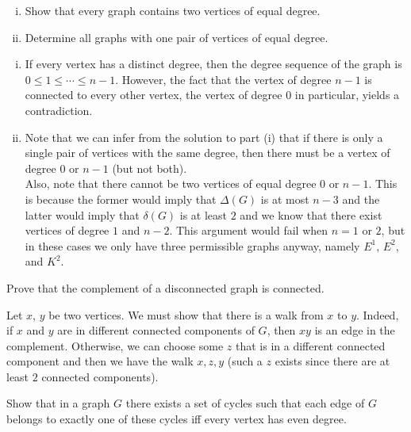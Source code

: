 \begin{exercise}\phantom{owo}
\begin{enumerate}[(i)]
    \item Show that every graph contains two vertices of equal degree.
    \item Determine all graphs with one pair of vertices of equal degree.
\end{enumerate}
\end{exercise}
\begin{solution}
\begin{enumerate}[(i)]
    \item If every vertex has a distinct degree, then the degree sequence of the graph is $0\leq 1\leq\cdots\leq n-1$. However, the fact that the vertex of degree $n-1$ is connected to every other vertex, the vertex of degree $0$ in particular, yields a contradiction.
    
    \item Note that we can infer from the solution to part (i) that if there is only a single pair of vertices with the same degree, then there must be a vertex of degree $0$ or $n-1$ (but not both).\\
    Also, note that there cannot be two vertices of equal degree $0$ or $n-1$. This is because the former would imply that $\Delta(G)$ is at most $n-3$ and the latter would imply that $\delta(G)$ is at least $2$ and we know that there exist vertices of degree $1$ and $n-2$. This argument would fail when $n=1$ or $2$, but in these cases we only have three permissible graphs anyway, namely $E^1$, $E^2$, and $K^2$. \\
\end{enumerate}
\end{solution}

\begin{exercise}
Prove that the complement of a disconnected graph is connected.
\end{exercise}
\begin{solution}
Let $x$, $y$ be two vertices. We must show that there is a walk from $x$ to $y$. Indeed, if $x$ and $y$ are in different connected components of $G$, then $xy$ is an edge in the complement. Otherwise, we can choose some $z$ that is in a different connected component and then we have the walk $x,z,y$ (such a $z$ exists since there are at least $2$ connected components).
\end{solution}

\begin{exercise}
Show that in a graph $G$ there exists a set of cycles such that each edge of $G$ belongs
to exactly one of these cycles iff every vertex has even degree.
\end{exercise}

